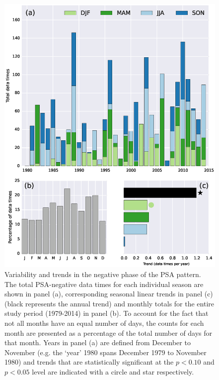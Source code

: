 \begin{figure}
\begin{center}
\includegraphics[width=0.7\columnwidth]{figures/psa/psa-seasonality-psa-neg_ERAInterim_500hPa-lat10S10Nmean-lon115E235Ezeropad_030day-runmean-anom-wrt-all_native-np20N260E.eps}
\caption[Variability and trends in the negative phase of the PSA pattern]{\label{fig:psa-neg_seasonality}
Variability and trends in the negative phase of the PSA pattern. The total PSA-negative data times for each individual season are shown in panel (a), corresponding seasonal linear trends in panel (c) (black represents the annual trend) and monthly totals for the entire study period (1979-2014) in panel (b). To account for the fact that not all months have an equal number of days, the counts for each month are presented as a percentage of the total number of days for that month. Years in panel (a) are defined from December to November (e.g. the `year' 1980 spans December 1979 to November 1980) and trends that are statistically significant at the $p < 0.10$ and $p < 0.05$ level are indicated with a circle and star respectively.%
}
\end{center}
\end{figure}

